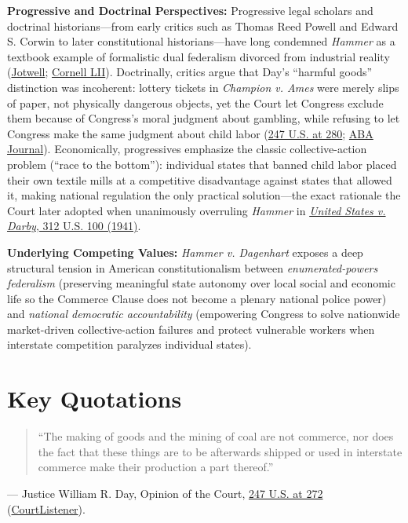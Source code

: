 \documentclass[12pt]{article}
\begin{document}
\textbf{Progressive and Doctrinal Perspectives:} Progressive legal scholars and doctrinal historians---from early critics such as Thomas Reed Powell and Edward S. Corwin to later constitutional historians---have long condemned \textit{Hammer} as a textbook example of formalistic dual federalism divorced from industrial reality (\href{https://conlaw.jotwell.com/federalism-and-child-labor-revisited/}{Jotwell}; \href{https://www.law.cornell.edu/constitution-conan/article-1/section-8/clause-3/dual-federalism-and-commerce-clause}{Cornell LII}). Doctrinally, critics argue that Day's ``harmful goods'' distinction was incoherent: lottery tickets in \textit{Champion v. Ames} were merely slips of paper, not physically dangerous objects, yet the Court let Congress exclude them because of Congress's moral judgment about gambling, while refusing to let Congress make the same judgment about child labor (\href{https://supreme.justia.com/cases/federal/us/247/251/}{247 U.S. at 280}; \href{https://www.abajournal.com/magazine/article/june_3_1918_child_labor_law_declared_unconstitutional}{ABA Journal}). Economically, progressives emphasize the classic collective-action problem (``race to the bottom''): individual states that banned child labor placed their own textile mills at a competitive disadvantage against states that allowed it, making national regulation the only practical solution---the exact rationale the Court later adopted when unanimously overruling \textit{Hammer} in \href{https://supreme.justia.com/cases/federal/us/312/100/}{\textit{United States v. Darby}, 312 U.S. 100 (1941)}.

\textbf{Underlying Competing Values:} \textit{Hammer v. Dagenhart} exposes a deep structural tension in American constitutionalism between \textit{enumerated-powers federalism} (preserving meaningful state autonomy over local social and economic life so the Commerce Clause does not become a plenary national police power) and \textit{national democratic accountability} (empowering Congress to solve nationwide market-driven collective-action failures and protect vulnerable workers when interstate competition paralyzes individual states).

\section{Key Quotations}
\begin{quote}
``The making of goods and the mining of coal are not commerce, nor does the fact that these things are to be afterwards shipped or used in interstate commerce make their production a part thereof.''
\end{quote}
\noindent --- Justice William R. Day, Opinion of the Court, \href{https://supreme.justia.com/cases/federal/us/247/251/}{247 U.S. at 272} (\href{https://www.courtlistener.com/opinion/99190/hammer-v-dagenhart/}{CourtListener}).
\end{document}
